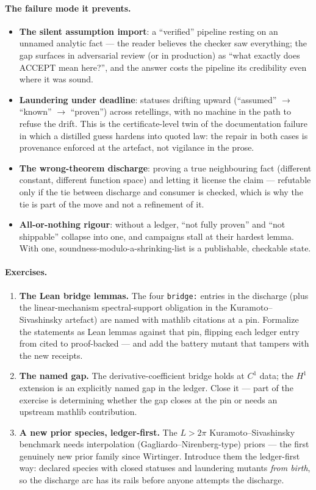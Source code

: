 \paragraph{The failure mode it prevents.}
\begin{itemize}
\item \textbf{The silent assumption import}: a ``verified'' pipeline
  resting on an unnamed analytic fact --- the reader believes the
  checker saw everything; the gap surfaces in adversarial review (or in
  production) as ``what exactly does ACCEPT mean here?'', and the
  answer costs the pipeline its credibility even where it was sound.
\item \textbf{Laundering under deadline}: statuses drifting upward
  (``assumed'' $\to$ ``known'' $\to$ ``proven'') across retellings,
  with no machine in the path to refuse the drift. This is the
  certificate-level twin of the documentation failure in which a
  distilled guess hardens into quoted law: the repair in both cases is
  provenance enforced at the artefact, not vigilance in the prose.
\item \textbf{The wrong-theorem discharge}: proving a true neighbouring
  fact (different constant, different function space) and letting it
  license the claim --- refutable only if the tie between discharge and
  consumer is checked, which is why the tie is part of the move and not
  a refinement of it.
\item \textbf{All-or-nothing rigour}: without a ledger, ``not fully
  proven'' and ``not shippable'' collapse into one, and campaigns stall
  at their hardest lemma. With one, soundness-modulo-a-shrinking-list
  is a publishable, checkable state.
\end{itemize}

\paragraph{Exercises.}
\begin{enumerate}
\item \textbf{The Lean bridge lemmas.} The four \texttt{bridge:}
  entries in the discharge (plus the linear-mechanism spectral-support
  obligation in the Kuramoto--Sivashinsky artefact) are named with
  mathlib citations at a pin. Formalize the statements as Lean lemmas
  against that pin, flipping each ledger entry from cited to
  proof-backed --- and add the battery mutant that tampers with the new
  receipts.
\item \textbf{The named gap.} The derivative-coefficient bridge holds
  at $C^1$ data; the $H^1$ extension is an explicitly named gap in the
  ledger. Close it --- part of the exercise is determining whether the
  gap closes at the pin or needs an upstream mathlib contribution.
\item \textbf{A new prior species, ledger-first.} The $L > 2\pi$
  Kuramoto--Sivashinsky benchmark needs interpolation
  (Gagliardo--Nirenberg-type) priors --- the first genuinely new prior
  family since Wirtinger. Introduce them the ledger-first way: declared
  species with closed statuses and laundering mutants \emph{from
  birth}, so the discharge arc has its rails before anyone attempts the
  discharge.
\end{enumerate}

